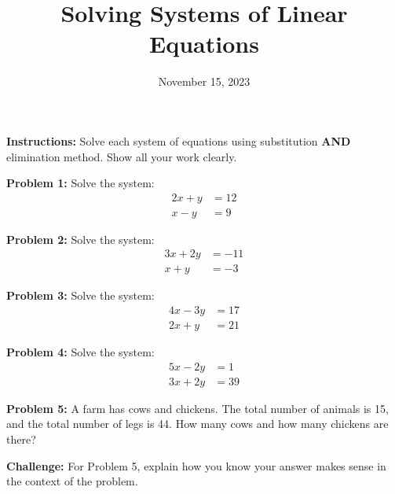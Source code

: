 \documentclass[12pt]{article}
\title{Solving Systems of Linear Equations}
\date{November 15, 2023}
\begin{document}
\maketitle

\textbf{Instructions:} Solve each system of equations using substitution \textbf{AND} elimination method. Show all your work clearly.

\vspace{0.3in}

\textbf{Problem 1:} Solve the system:
\begin{align*}
    2x + y &= 12 \\
    x - y &= 9
\end{align*}

\vspace{0.4in}

\textbf{Problem 2:} Solve the system:
\begin{align*}
    3x + 2y &= -11 \\
    x + y &= -3
\end{align*}

\vspace{0.4in}

\textbf{Problem 3:} Solve the system:
\begin{align*}
    4x - 3y &= 17 \\
    2x + y &= 21
\end{align*}

\vspace{0.4in}

\textbf{Problem 4:} Solve the system:
\begin{align*}
    5x - 2y &= 1 \\
    3x + 2y &= 39
\end{align*}

\vspace{0.4in}

\textbf{Problem 5:} A farm has cows and chickens. The total number of animals is 15, and the total number of legs is 44. How many cows and how many chickens are there?

\vspace{0.3in}

\textbf{Challenge:} For Problem 5, explain how you know your answer makes sense in the context of the problem.
\end{document}
